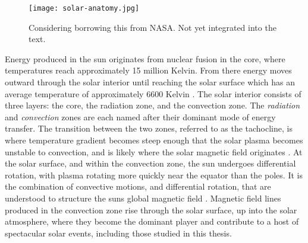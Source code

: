  

 
\begin{figure}
	\texttt{[image: solar-anatomy.jpg]}
	\caption{Considering borrowing this from NASA. Not yet integrated into the text.}
\end{figure} 
 
Energy produced in the sun originates from nuclear fusion in the core, where temperatures reach approximately 15 million Kelvin.
From there energy moves outward through the solar interior until reaching the solar surface which has an average temperature of approximately 6600 Kelvin  \citep{SolarPhysicsOverview}. 
The solar interior consists of three layers: the core, the radiation zone, and the convection zone.
The \emph{radiation} and \emph{convection} zones are each named after their dominant mode of energy transfer.
The transition between the two zones, referred to as the tachocline, is where temperature gradient becomes steep enough that the solar plasma becomes unstable to convection, and is likely where the solar magnetic field originates \citep{SolarPhysicsOverview}.
At the solar surface, and within the convection zone, the sun undergoes differential rotation, with plasma rotating more quickly near the equator than the poles.
It is the combination of convective motions, and differential rotation, that are understood to structure the suns global magnetic field \citep{Parker1979,Priest2014,JudgeBook}.
Magnetic field lines produced in the convection zone rise through the solar surface, up into the solar atmosphere, where they become the dominant player and contribute to a host of spectacular solar events, including those studied in this thesis.


